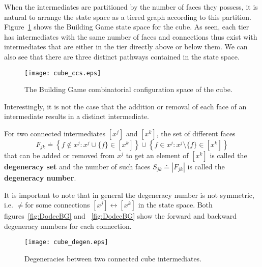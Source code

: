 When the intermediates are partitioned by the number of faces they possess, it is natural to arrange the state space as a tiered graph according to this partition. Figure~\ref{fig:CubeCCS} shows the Building Game state space for the cube. As seen, each tier has intermediates with the same number of faces and connections thus exist with intermediates that are either in the tier directly above or below them. We can also see that there are three distinct pathways contained in the state space. 

\begin{figure}[ht]
\texttt{[image: cube\_ccs.eps]}
\caption{The Building Game combinatorial configuration space of the cube.}
\label{fig:CubeCCS}    
\end{figure}

Interestingly, it is not the case that the addition or removal of each face of an intermediate results in a distinct intermediate. 
\begin{mydef}
For two connected intermediates $[x^j]$ and $[x^k]$, the set of different faces $$F_{jk} \doteq \left\{f \notin x^j : x^j\cup\{f\} \in [x^k]\right\}\cup\left\{f \in x^j : x^j\setminus\{f\} \in [x^k]\right\}$$ that can be added or removed from $x^j$ to get an element of $[x^k]$ is called the \textbf{degeneracy set} and the number of such faces $S_{jk} \doteq \left|F_{jk}\right|$ is called the \textbf{degeneracy number}.
\end{mydef}

It is important to note that in general the degeneracy number is not symmetric, i.e. \Sjk$\neq$\Skj\spc for some connections $[x^j] \leftrightarrow [x^k]$ in the state space. Both figures~\ref{fig:DodecBG} and ~\ref{fig:DodecBG} show the forward and backward degeneracy numbers for each connection.


\begin{figure}[ht]
\texttt{[image: cube\_degen.eps]}
\caption{Degeneracies between two connected cube intermediates.}
\label{fig:CubeDegen}    
\end{figure}




